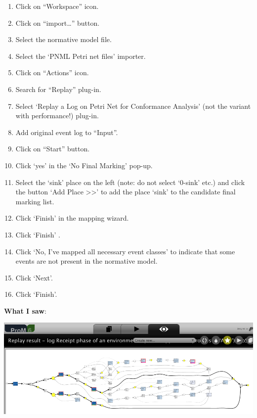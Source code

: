 \documentclass[]{article}
\begin{document}
\begin{enumerate}
\def\labelenumi{\arabic{enumi}.}
\itemsep1pt\parskip0pt
\item
  Click on ``Workspace'' icon.\\
\item
  Click on ``import\ldots{}'' button.\\
\item
  Select the normative model file.\\
\item
  Select the `PNML Petri net files' importer.\\
\item
  Click on ``Actions'' icon.\\
\item
  Search for ``Replay'' plug-in.\\
\item
  Select `Replay a Log on Petri Net for Conformance Analysis' (not the
  variant with performance!) plug-in.
\item
  Add original event log to ``Input''.\\
\item
  Click on ``Start'' button.\\
\item
  Click `yes' in the `No Final Marking' pop-up.
\item
  Select the `sink' place on the left (note: do not select `0-sink'
  etc.) and click the button `Add Place \textgreater{}\textgreater{}' to
  add the place `sink' to the candidate final marking list.
\item
  Click `Finish' in the mapping wizard.\\
\item
  Click `Finish' .\\
\item
  Click `No, I've mapped all necessary event classes' to indicate that
  some events are not present in the normative model.\\
\item
  Click `Next'.\\
\item
  Click `Finish'.
\end{enumerate}

\textbf{What I saw}:

\includegraphics{CoSeLoG_Step_06_PetriNet_Normative_Conformance.png}
\end{document}
